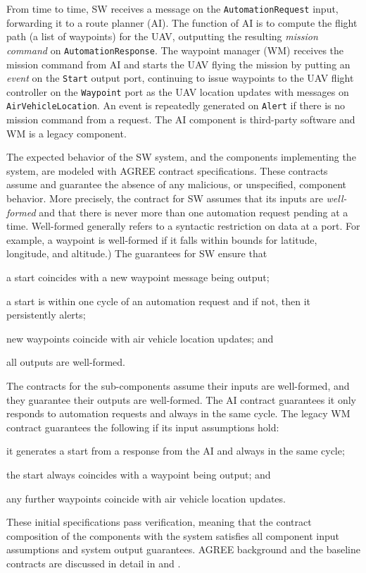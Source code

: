 From time to time, SW receives a message on the \texttt{AutomationRequest} input,
forwarding it to a route planner (AI). The function of AI is to 
compute the flight path (a list of waypoints) for the UAV, outputting
the resulting \emph{mission command} on \texttt{AutomationResponse}.
The waypoint manager (WM) receives the mission command from AI and
starts the UAV flying the mission by putting an \emph{event} on the
\texttt{Start} output port, continuing to issue waypoints to the UAV
flight controller on the \texttt{Waypoint} port as the UAV location
updates with messages on \texttt{AirVehicleLocation}.
An event is repeatedly generated on \texttt{Alert} if there is no
mission command from a request. The AI component is third-party
software and WM is a legacy component.


The expected behavior of the SW system, and the components
implementing the system, are modeled with AGREE contract
specifications.  
These contracts assume and guarantee the absence
of any malicious, or unspecified, component behavior.  More precisely,
the contract for SW assumes that its inputs are \emph{well-formed} and that
there is never more than one automation request pending at a time.
Well-formed generally refers to a syntactic restriction on
data at a port. For example, a waypoint is well-formed if it falls
within bounds for latitude, longitude, and altitude.)  The guarantees
for SW ensure that
\begin{compactitem}
\item a start coincides with a new waypoint message being output;
\item a start is within one cycle of an automation request and if not, then it persistently alerts;
\item new waypoints coincide with air vehicle location updates; and
\item all outputs are well-formed.
\end{compactitem}

The contracts for the sub-components assume their inputs are
well-formed, and they guarantee their outputs are well-formed.  The AI
contract guarantees it only responds to automation requests and always
in the same cycle.  The legacy WM contract guarantees the following if
its input assumptions hold:
\begin{compactitem}
  \item it generates a start from a response from the AI and always in the same cycle;
  \item the start always coincides with a waypoint being output; and
  \item any further waypoints coincide with air vehicle location updates.
\end{compactitem}
These initial specifications pass verification, meaning that the
contract composition of the components with the system satisfies all
component input assumptions and system output guarantees.
AGREE background and the baseline contracts are discussed in detail in  and .

